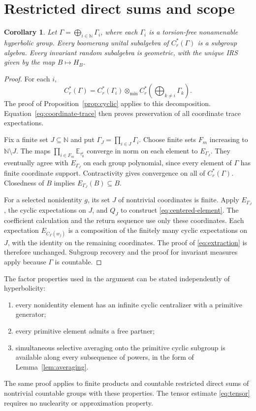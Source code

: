 \documentclass[11pt,letterpaper]{amsart}
\numberwithin{equation}{section}
\newtheorem{corollary}[theorem]{Corollary}
\theoremstyle{definition}
\theoremstyle{remark}
\newcommand{\Cr}{C_r^*}
\newcommand{\N}{\mathbb N}
\newcommand{\Etrace}[1]{\mathbb E_{\tau_0^{#1}}}
\begin{document}
\section{Restricted direct sums and scope}\label{sec:extensions}

\begin{corollary}\label{cor:restricted-sum}
Let $\Gamma=\bigoplus_{i\in\N}\Gamma_i$, where each $\Gamma_i$ is a
torsion-free nonamenable hyperbolic group.
Every boomerang unital subalgebra of $\Cr(\Gamma)$ is a subgroup
algebra. Every invariant random subalgebra is geometric, with the
unique IRS given by the map $B\mapsto H_B$.
\end{corollary}
\begin{proof}
For each $i$,
\[
 \Cr(\Gamma)=\Cr(\Gamma_i)\otimes_{\min}
                   \Cr\left(\bigoplus_{k\ne i}\Gamma_k\right).
\]
The proof of Proposition~\ref{prop:cyclic} applies to this decomposition.
Equation~\eqref{eq:coordinate-trace} then proves preservation of all
coordinate trace expectations.

Fix a finite set $J\subseteq\N$ and put
$\Gamma_J=\prod_{i\in J}\Gamma_i$.
Choose finite sets $F_m$ increasing to $\N\setminus J$.
The maps $\prod_{i\in F_m}\Etrace{i}$ converge in norm on each element
to $E_{\Gamma_J}$. They eventually agree with $E_{\Gamma_J}$ on
each group polynomial, since every element of $\Gamma$ has finite
coordinate support. Contractivity gives convergence on all of
$\Cr(\Gamma)$. Closedness of $B$ implies
$E_{\Gamma_J}(B)\subseteq B$.

For a selected nonidentity $g$, its set $J$ of nontrivial coordinates
is finite. Apply $E_{\Gamma_J}$, the cyclic expectations on $J$, and
$Q_J$ to construct \eqref{eq:centered-element}.
The coefficient calculation and the return sequence use only these
coordinates. Each expectation $E_{C_\Gamma(w_j)}$ is a composition
of the finitely many cyclic expectations on $J$, with the identity
on the remaining coordinates.
The proof of \eqref{eq:extraction} is therefore unchanged.
Subgroup recovery and the proof for invariant measures apply because
$\Gamma$ is countable.
\end{proof}

The factor properties used in the argument can be stated independently
of hyperbolicity:
\begin{enumerate}[label=(\roman*),leftmargin=*]
\item every nonidentity element has an infinite cyclic centralizer
with a primitive generator;
\item every primitive element admits a free partner;
\item simultaneous selective averaging onto the primitive cyclic
subgroup is available along every subsequence of powers, in the form
of Lemma~\ref{lem:averaging}.
\end{enumerate}
The same proof applies to finite products and countable restricted
direct sums of nontrivial countable groups with these properties.
The tensor estimate \eqref{eq:tensor} requires no nuclearity or
approximation property.
\end{document}
